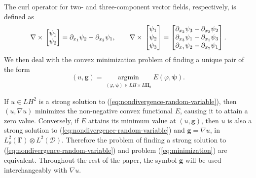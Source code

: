 \documentclass[final,onefignum,onetabnum]{mousaviart}
\begin{document}
	The curl operator for two- and three-component vector fields, respectively, is defined as
	\begin{equation}
		\label{eq:curl-operator}
		\nabla \times \\
		\begin{bmatrix}
			\psi_1
			\\
			\psi_2
		\end{bmatrix}
		=
		\partial_{x_1} \psi_2 - \partial_{x_2} \psi_1,
		\qquad
		\nabla \times \\
		\begin{bmatrix}
			\psi_1
			\\
			\psi_2
			\\
			\psi_3
		\end{bmatrix}
		= 
		\begin{bmatrix}
			\partial_{x_2} \psi_3 - \partial_{x_3} \psi_2
			\\
			\partial_{x_3} \psi_1 - \partial_{x_1} \psi_3
			\\
			\partial_{x_1} \psi_2 - \partial_{x_2} \psi_1
		\end{bmatrix}.
	\end{equation}
	We then deal with the convex minimization problem of finding a unique pair of the form
	\begin{equation}
		\label{eq:minimization}
		(u, \boldsymbol{g})= 
		\underset
		{\substack{
				(\varphi, \boldsymbol{\psi})\in 
				LH \times L\boldsymbol{H}_{\boldsymbol{t}}
		}}
		{\mathrm{argmin}}
		E(\varphi ,\boldsymbol{\psi}).
	\end{equation}
	
	\vspace*{1mm}
	\begin{remark}
		\label{rem:equivalent-problems}
		If $u \in LH^2$ is a strong solution to (\ref{eq:nondivergence-random-variable}), then $(u, \nabla u)$ minimizes the non-negative convex functional $E$, causing it to attain a zero value.
		Conversely, if $E$ attains its minimum value at $(u, \boldsymbol{g})$, then $u$ is also a strong solution to (\ref{eq:nondivergence-random-variable}) and	$ \boldsymbol{g} = \nabla u$, in $L^2_{\rho}(\boldsymbol{\Gamma}) \otimes L^2(\mathcal{D})$. 
		Therefore the problem of finding a strong solution to (\ref{eq:nondivergence-random-variable}) and problem (\ref{eq:minimization}) are equivalent. Throughout the rest of the paper, the symbol $\boldsymbol{g}$ will be used interchangeably with $\nabla u$.
	\end{remark}
	
\end{document}
